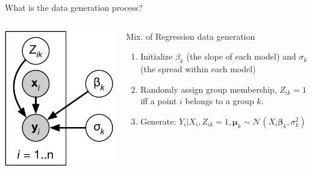 \documentclass[
  ignorenonframetext,
  aspectratio=169]{beamer}
\begin{document}
\begin{frame}{What is the data generation process?}
\protect\hypertarget{what-is-the-data-generation-process}{}
\begin{columns}[T]
\begin{column}{.4\textwidth}
\scriptsize

\begin{center}\includegraphics[width=.7\linewidth]{./Vis/unsupervised/MoR_graphical_model} \end{center}

\normalsize
\end{column}

\begin{column}{.5\textwidth}
\begin{block}{Mix. of Regression data generation}
\protect\hypertarget{mix.-of-regression-data-generation}{}
\begin{enumerate}
\item
  Initialize \(\beta_{k}\) (the slope of each model) and \(\sigma_{k}\)
  (the spread within each model)
\item
  Randomly assign group membership, \(Z_{ik} = 1\) iff a point \(i\)
  belongs to a group \(k\).
\item
  Generate:
  \(Y_{i} | X_{i}, Z_{ik} = 1, \boldsymbol{\mu}_{k} \sim \mathcal{N}\!\left(X_{i}\boldsymbol{\beta}_{k}, \sigma_{k}^{2}\right)\)
\end{enumerate}
\end{block}
\end{column}
\end{columns}
\end{frame}
\end{document}
